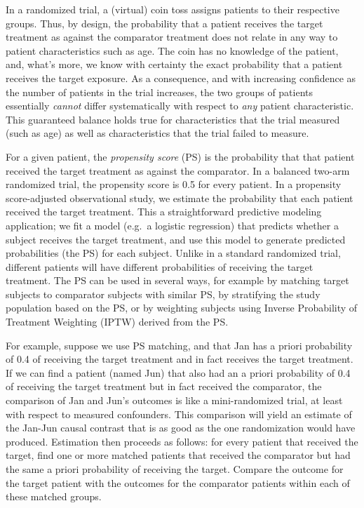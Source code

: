 \documentclass[11pt]{book}
\begin{document}
In a randomized trial, a (virtual) coin toss assigns patients to their
respective groups. Thus, by design, the probability that a patient
receives the target treatment as against the comparator treatment does
not relate in any way to patient characteristics such as age. The coin
has no knowledge of the patient, and, what's more, we know with
certainty the exact probability that a patient receives the target
exposure. As a consequence, and with increasing confidence as the number
of patients in the trial increases, the two groups of patients
essentially \emph{cannot} differ systematically with respect to
\emph{any} patient characteristic. This guaranteed balance holds true
for characteristics that the trial measured (such as age) as well as
characteristics that the trial failed to measure.

For a given patient, the \emph{propensity score} (PS) is the probability
that that patient received the target treatment as against the
comparator. \citep{rosenbaum_1983} In a balanced two-arm randomized
trial, the propensity score is 0.5 for every patient. In a propensity
score-adjusted observational study, we estimate the probability that
each patient received the target treatment. This a straightforward
predictive modeling application; we fit a model (e.g.~a logistic
regression) that predicts whether a subject receives the target
treatment, and use this model to generate predicted probabilities (the
PS) for each subject. Unlike in a standard randomized trial, different
patients will have different probabilities of receiving the target
treatment. The PS can be used in several ways, for example by matching
target subjects to comparator subjects with similar PS, by stratifying
the study population based on the PS, or by weighting subjects using
Inverse Probability of Treatment Weighting (IPTW) derived from the PS.

For example, suppose we use PS matching, and that Jan has a priori
probability of 0.4 of receiving the target treatment and in fact
receives the target treatment. If we can find a patient (named Jun) that
also had an a priori probability of 0.4 of receiving the target
treatment but in fact received the comparator, the comparison of Jan and
Jun's outcomes is like a mini-randomized trial, at least with respect to
measured confounders. This comparison will yield an estimate of the
Jan-Jun causal contrast that is as good as the one randomization would
have produced. Estimation then proceeds as follows: for every patient
that received the target, find one or more matched patients that
received the comparator but had the same a priori probability of
receiving the target. Compare the outcome for the target patient with
the outcomes for the comparator patients within each of these matched
groups.
\end{document}
